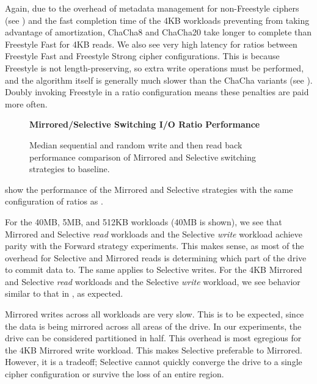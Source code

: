 Again, due to the overhead of metadata management for non-Freestyle ciphers (see
) and the fast completion time of the 4KB workloads
preventing \sys from taking advantage of amortization, ChaCha8 and ChaCha20 take
longer to complete than Freestyle Fast for 4KB reads. We also see very high
latency for ratios between Freestyle Fast and Freestyle Strong cipher
configurations. This is because Freestyle is not length-preserving, so extra
write operations must be performed, and the algorithm itself is generally much
slower than the ChaCha variants (see ). Doubly
invoking Freestyle in a ratio configuration means these penalties are paid more
often.

\begin{figure}[ht]
  \textbf{Mirrored/Selective Switching I/O Ratio Performance}\par\medskip
  \centering
  {} \caption{Median sequential and
  random write and then read back performance comparison of Mirrored and
  Selective switching strategies to baseline.}
 \label{fig:mirrored-selective-baseline}
\end{figure}

 show the performance of the Mirrored and
Selective strategies with the same configuration of ratios as
.

For the 40MB, 5MB, and 512KB workloads (40MB is shown), we see that Mirrored and
Selective \emph{read} workloads and the Selective \emph{write} workload achieve
parity with the Forward strategy experiments. This makes sense, as most of the
overhead for Selective and Mirrored reads is determining which part of the drive
to commit data to. The same applies to Selective writes. For the 4KB Mirrored
and Selective \emph{read} workloads and the Selective \emph{write} workload, we
see behavior similar to that in , as expected.

Mirrored writes across all workloads are very slow. This is to be expected,
since the data is being mirrored across all areas of the drive. In our
experiments, the drive can be considered partitioned in half. This overhead is
most egregious for the 4KB Mirrored write workload. This makes Selective
preferable to Mirrored. However, it is a tradeoff; Selective cannot quickly
converge the drive to a single cipher configuration or survive the loss of an
entire region.


